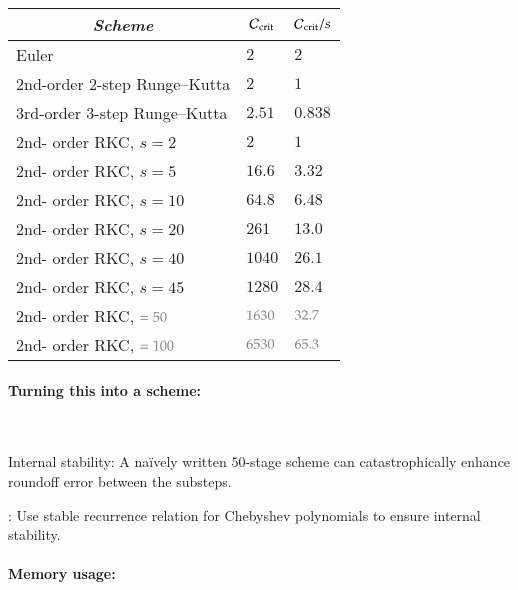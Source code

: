 \documentclass[\mydriver,12pt,twoside,notitlepage]{article}
\newcommand{\Black}{\color{black}}
\newcommand{\GreyedOut}{\color{gray60}}
\newcommand{\colEmph}[1]{{\color{DarkishBlue}#1}}
\newcommand{\Courant} {\mathcal{C}}
\begin{document}
\begin{center}
\boldmath
  \begin{tabular}{lll}
  \toprule
    \multicolumn{1}{c}{\Black \emph{Scheme}} &
      \multicolumn{1}{c}{$\Courant_{\rm crit}$} &
        \multicolumn{1}{c}{$\Courant_{\rm crit}/s$}\\
  \midrule
    \Black Euler                         & $2$    & $2$ \\
    \Black 2nd-order 2-step Runge--Kutta & $2$    & $1$ \\
    \Black 3rd-order 3-step Runge--Kutta & $2.51$ & $0.838$ \\
  \midrule
    \Black 2nd- order RKC, $s=2$         & $2$    & $1$ \\
    \Black 2nd- order RKC, $s=5$         & $16.6$ & $3.32$ \\
    \Black 2nd- order RKC, $s=10$        & $64.8$ & $6.48$ \\
    \Black 2nd- order RKC, $s=20$        & $261$  & $13.0$ \\
    \Black 2nd- order RKC, $s=40$        & $1040$ & $26.1$ \\
    \Black 2nd- order RKC, $s=45$        & $1280$ & $28.4$ \\
    \color{gray60}
    2nd- order RKC, $\GreyedOut=50$      & $\GreyedOut1630$ & $\GreyedOut32.7$ \\
    \color{gray60}
    2nd- order RKC, $\GreyedOut=100$     & $\GreyedOut6530$ & $\GreyedOut65.3$ \\
  \bottomrule
  \end{tabular}
\end{center}

\clearpage

%
\paragraph{Turning this into a scheme:} \

\colEmph{Internal stability:} A naïvely written $50$-stage scheme can
catastrophically enhance roundoff error between the substeps.

\cite{SommeijerEtal:RKC}: Use stable recurrence relation for Chebyshev
polynomials to ensure internal stability.

\bigskip

\paragraph{Memory usage:} \
\end{document}
